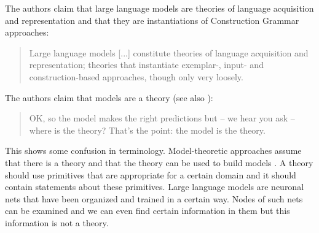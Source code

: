 The authors claim that large language models are theories of language acquisition and representation
and that they are instantiations of Construction Grammar \citep{Goldberg2006a} approaches:
\begin{quote}
Large language models [...] constitute theories of language acquisition and representation; theories
that instantiate exemplar-, input- and construction-based approaches, though only very
loosely. \citep[]{AmbridgeBlything2024a}
\end{quote}

\noindent
The authors claim that models are a theory (see also \citealt[360]{Piantadosi2024a}):
\begin{quote}
OK, so the model makes the right predictions but -- we hear you ask -- where is the theory? That's
the point: the model is the theory.
\citep[]{AmbridgeBlything2024a}
\end{quote}
This shows some confusion in terminology. Model-theoretic approaches assume that there is a theory
and that the theory can be used to build models \citep{Richter2021a}. A theory should use primitives
that are appropriate for a certain domain and it should contain statements about these
primitives. Large language models are neuronal nets that have been organized and trained in a
certain way. Nodes of such nets can be examined and we can even find certain information in them
\citep{ManningClarkHewitt2020a,ZhangBowman2018a} but this information is not a theory.

